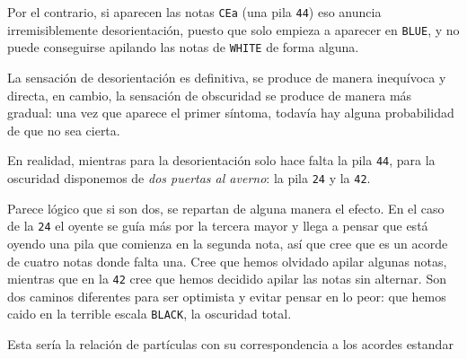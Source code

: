 \documentclass[]{report}
\begin{document}
  Por el contrario, si aparecen las notas \texttt{CEa} (una pila \texttt{44}) eso anuncia irremisiblemente desorientación, puesto que solo empieza a aparecer en \texttt{BLUE}, y no puede conseguirse apilando las notas de \texttt{WHITE} de forma alguna.
  
  La sensación de desorientación es definitiva, se produce de manera inequívoca y directa, en cambio, la sensación de obscuridad se produce de manera más gradual: una vez que aparece el primer síntoma, todavía hay alguna probabilidad de que no sea cierta.
  
  En realidad, mientras para la desorientación solo hace falta la pila \texttt{44}, para la oscuridad disponemos de \emph{dos puertas al averno}: la pila \texttt{24} y la \texttt{42}.
  
  Parece lógico que si son dos, se repartan de alguna manera el efecto. En el caso de la \texttt{24} el oyente se guía más por la tercera mayor y llega a pensar que está oyendo una pila que comienza en la segunda nota, así que cree que es un acorde de cuatro notas donde falta una. Cree que hemos olvidado apilar algunas notas, mientras que en la \texttt{42} cree que hemos decidido apilar las notas sin alternar. Son dos caminos diferentes para ser optimista y evitar pensar en lo peor: que hemos caido en la terrible escala \texttt{BLACK}, la oscuridad total.

  Esta sería la relación de partículas con su correspondencia a los acordes estandar

  
\end{document}
